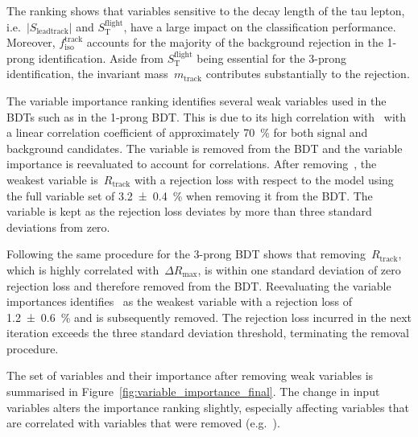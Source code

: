 The ranking shows that variables sensitive to the decay length of the tau
lepton, i.e.\ $|S_\text{leadtrack}|$ and $S_\text{T}^\text{flight}$, have a
large impact on the classification performance. Moreover,
$f_\text{iso}^\text{track}$ accounts for the majority of the background
rejection in the 1-prong identification. Aside from $S_\text{T}^\text{flight}$
being essential for the 3-prong identification, the invariant
mass~$m_\text{track}$ contributes substantially to the rejection.

The variable importance ranking identifies several weak variables used in the
BDTs such as  in the 1-prong BDT. This is
due to its high correlation
with~ with a linear correlation
coefficient of approximately \SI{70}{\percent} for both signal and background
\tauhadvis candidates. The variable is removed from the BDT and the variable
importance is reevaluated to account for correlations. After
removing~, the weakest variable
is~$R_\text{track}$ with a rejection loss with respect to the model using the
full variable set of \SI{3.2 +- 0.4}{\percent} when removing it from the BDT.
The variable is kept as the rejection loss deviates by more than three standard
deviations from zero.

Following the same procedure for the 3-prong BDT shows that
removing~$R_\text{track}$, which is highly correlated
with~$\Delta R_\text{max}$, is within one standard deviation of zero rejection
loss and therefore removed from the BDT. Reevaluating the variable importances
identifies~ as the weakest variable with a
rejection loss of \SI{1.2 +- 0.6}{\percent} and is subsequently removed. The
rejection loss incurred in the next iteration exceeds the three standard
deviation threshold, terminating the removal procedure.

The set of variables and their importance after removing weak variables is
summarised in Figure~\ref{fig:variable_importance_final}. The change in input
variables alters the importance ranking slightly, especially affecting variables
that are correlated with variables that were removed (e.g.\
).

